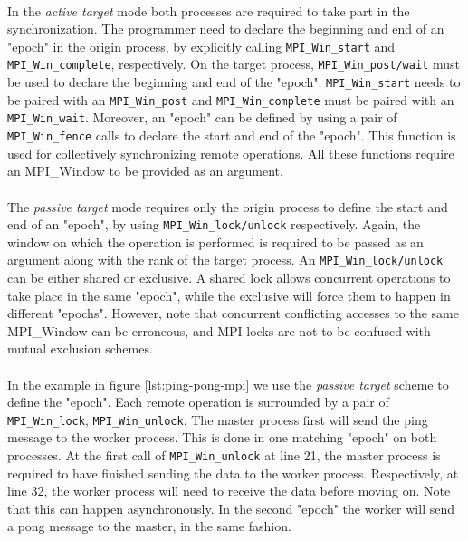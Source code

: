 \paragraph{}
In the \emph{active target} mode both processes are required to take part in the synchronization.  The programmer 
need to declare the beginning and end of an "epoch" in the origin process, by explicitly calling 
\texttt{MPI\_Win\_start} and \texttt{MPI\_Win\_complete}, respectively.
On the target process, \texttt{MPI\_Win\_post/wait} must be used to declare the beginning and end of the "epoch".
\texttt{MPI\_Win\_start} needs
to be paired with an \texttt{MPI\_Win\_post} and \texttt{MPI\_Win\_complete} must be paired with an \texttt{MPI\_Win\_wait}.  
Moreover, an "epoch" can be defined by using a pair of \texttt{MPI\_Win\_fence} calls to declare the start and end of the 
"epoch".  This function is used for collectively synchronizing remote operations.  
All these functions require an MPI\_Window to be provided as an argument. 

\paragraph{}
The \emph{passive target} mode requires only the origin process to define the start and end of an "epoch", by using 
\texttt{MPI\_Win\_lock/unlock} respectively.  Again, the window on which the operation is performed is required to be passed as
an argument along with the rank of the target process.  An \texttt{MPI\_Win\_lock/unlock} can be either shared or exclusive.
A shared lock allows concurrent operations to take place in the same "epoch", while the exclusive will force them
to happen in different "epochs".  However, note that concurrent conflicting accesses to the same MPI\_Window can be 
erroneous, and MPI locks are not to be confused with mutual exclusion schemes.

\paragraph{}
In the example in figure \ref{lst:ping-pong-mpi} we use the \emph{passive target} scheme to define the "epoch".
Each remote operation is surrounded by a pair of \texttt{MPI\_Win\_lock}, \texttt{MPI\_Win\_unlock}.
The master process first will send
the ping message to the worker process.   This is done in one matching "epoch" on both processes.  At the first call 
of \texttt{MPI\_Win\_unlock} at line 21, the master process is required to have finished sending the data to the worker
process.   Respectively, at line 32, the worker process will need to receive the data before moving on.  Note that this
can happen asynchronously.  In the second "epoch" the worker will send a pong message to the master, in the same fashion.

